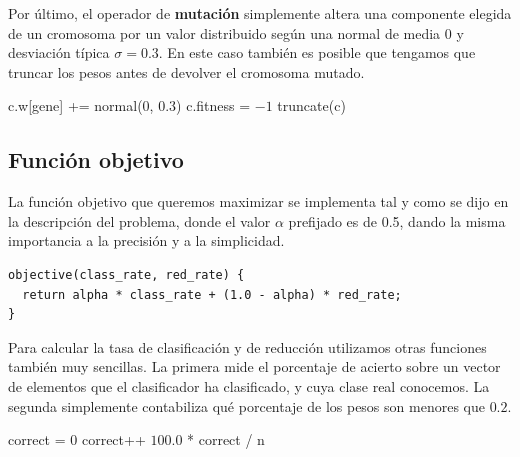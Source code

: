 \documentclass[12pt]{article}
\begin{document}
Por último, el operador de \textbf{mutación} simplemente altera una componente elegida de un cromosoma por un valor distribuido según una normal de media $0$ y desviación típica $\sigma = 0.3$. En este caso también es posible que tengamos que truncar los pesos antes de devolver el cromosoma mutado.


\begin{algorithm}[ht!]
\begin{algorithmic}

    \State c.w[gene] += normal($0$, $0.3$)
    \State c.fitness = $-1$  
    \State truncate(c)
    \State {}
\EndFunction

\end{algorithmic}
\end{algorithm}

\vspace{-1.5em}

\subsection*{{\color{red}Función objetivo}}

La función objetivo que queremos maximizar se implementa tal y como se dijo en la descripción del problema, donde el valor $\alpha$ prefijado es de 0.5, dando la misma importancia a la precisión y a la simplicidad.

\begin{verbatim}
objective(class_rate, red_rate) {
  return alpha * class_rate + (1.0 - alpha) * red_rate;
}
\end{verbatim}

Para calcular la tasa de clasificación y de reducción utilizamos otras funciones también muy sencillas. La primera mide el porcentaje de acierto sobre un vector de elementos que el clasificador ha clasificado, y cuya clase real conocemos. La segunda simplemente contabiliza qué porcentaje de los pesos son menores que $0.2$.

\begin{algorithm}[h!]
\begin{algorithmic}

    \State correct = $0$
      
            \State correct++
        \EndIf
    \EndFor
    \State \Return $100.0$ * correct / n
\EndFunction
  
\end{algorithmic}
\end{algorithm}
\end{document}

